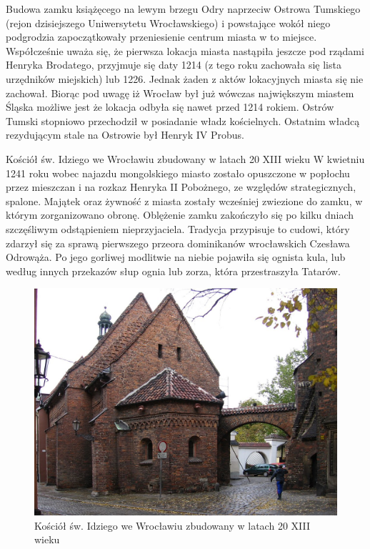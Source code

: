 \documentclass{article}
\begin{document}
Budowa zamku książęcego na lewym brzegu Odry naprzeciw Ostrowa Tumskiego (rejon dzisiejszego Uniwersytetu Wrocławskiego) i powstające wokół niego podgrodzia zapoczątkowały przeniesienie centrum miasta w to miejsce. Współcześnie uważa się, że pierwsza lokacja miasta nastąpiła jeszcze pod rządami Henryka Brodatego, przyjmuje się daty 1214 (z tego roku zachowała się lista urzędników miejskich) lub 1226. Jednak żaden z aktów lokacyjnych miasta się nie zachował. Biorąc pod uwagę iż Wrocław był już wówczas największym miastem Śląska możliwe jest że lokacja odbyła się nawet przed 1214 rokiem. Ostrów Tumski stopniowo przechodził w posiadanie władz kościelnych. Ostatnim władcą rezydującym stale na Ostrowie był Henryk IV Probus.


Kościół św. Idziego we Wrocławiu zbudowany w latach 20 XIII wieku
W kwietniu 1241 roku wobec najazdu mongolskiego miasto zostało opuszczone w popłochu przez mieszczan i na rozkaz Henryka II Pobożnego, ze względów strategicznych, spalone. Majątek oraz żywność z miasta zostały wcześniej zwiezione do zamku, w którym zorganizowano obronę. Oblężenie zamku zakończyło się po kilku dniach szczęśliwym odstąpieniem nieprzyjaciela. Tradycja przypisuje to cudowi, który zdarzył się za sprawą pierwszego przeora dominikanów wrocławskich Czesława Odrowąża. Po jego gorliwej modlitwie na niebie pojawiła się ognista kula, lub według innych przekazów słup ognia lub zorza, która przestraszyła Tatarów.

\begin{center}
\begin{figure}[h]
	\centering
	\includegraphics[scale=0.3]{Kościól.jpg}
	\caption{Kościół św. Idziego we Wrocławiu zbudowany w latach 20 XIII wieku}
\end{figure}
\end{center}
\end{document}
